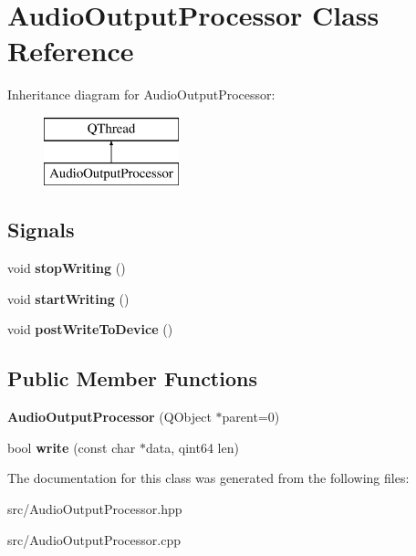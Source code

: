 \hypertarget{classAudioOutputProcessor}{\section{Audio\+Output\+Processor Class Reference}
\label{classAudioOutputProcessor}
}
Inheritance diagram for Audio\+Output\+Processor\+:\begin{figure}[H]
\begin{center}
\leavevmode
\includegraphics[height=2.000000cm]{classAudioOutputProcessor}
\end{center}
\end{figure}
\subsection*{Signals}
\begin{DoxyCompactItemize}
\item 
\hypertarget{classAudioOutputProcessor_ac5b95db59cbdb8d60f832653ae0a9793}{void {\bfseries stop\+Writing} ()}\label{classAudioOutputProcessor_ac5b95db59cbdb8d60f832653ae0a9793}

\item 
\hypertarget{classAudioOutputProcessor_a668b50fd985816d2d8a33f8546d72f42}{void {\bfseries start\+Writing} ()}\label{classAudioOutputProcessor_a668b50fd985816d2d8a33f8546d72f42}

\item 
\hypertarget{classAudioOutputProcessor_a763c98fb236616cd3b5d620dcf2e8a26}{void {\bfseries post\+Write\+To\+Device} ()}\label{classAudioOutputProcessor_a763c98fb236616cd3b5d620dcf2e8a26}

\end{DoxyCompactItemize}
\subsection*{Public Member Functions}
\begin{DoxyCompactItemize}
\item 
\hypertarget{classAudioOutputProcessor_ac345d660fcd1556450464f74973a8899}{{\bfseries Audio\+Output\+Processor} (Q\+Object $\ast$parent=0)}\label{classAudioOutputProcessor_ac345d660fcd1556450464f74973a8899}

\item 
\hypertarget{classAudioOutputProcessor_a3b5cb028b28051a7840cfe348683b472}{bool {\bfseries write} (const char $\ast$data, qint64 len)}\label{classAudioOutputProcessor_a3b5cb028b28051a7840cfe348683b472}

\end{DoxyCompactItemize}


The documentation for this class was generated from the following files\+:\begin{DoxyCompactItemize}
\item 
src/Audio\+Output\+Processor.\+hpp\item 
src/Audio\+Output\+Processor.\+cpp\end{DoxyCompactItemize}
